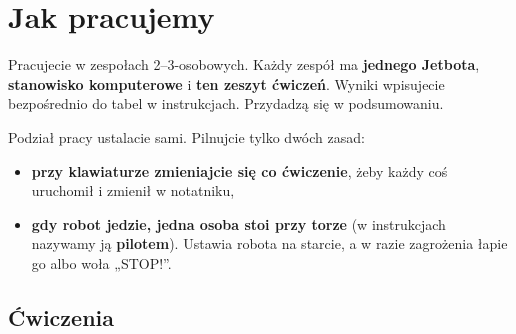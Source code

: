 \section{Jak pracujemy}\label{jak-pracujemy}

Pracujecie w zespołach 2--3-osobowych. Każdy zespół ma \textbf{jednego Jetbota}, \textbf{stanowisko komputerowe} i \textbf{ten zeszyt ćwiczeń}. Wyniki wpisujecie bezpośrednio do tabel w instrukcjach. Przydadzą się w podsumowaniu.

Podział pracy ustalacie sami. Pilnujcie tylko dwóch zasad:

\begin{itemize}
\tightlist
\item
  \textbf{przy klawiaturze zmieniajcie się co ćwiczenie}, żeby każdy coś uruchomił i zmienił w notatniku,
\item
  \textbf{gdy robot jedzie, jedna osoba stoi przy torze} (w instrukcjach nazywamy ją \textbf{pilotem}). Ustawia robota na starcie, a w razie zagrożenia łapie go albo woła „STOP!''.
\end{itemize}

\subsection{Ćwiczenia}\label{ux107wiczenia}

